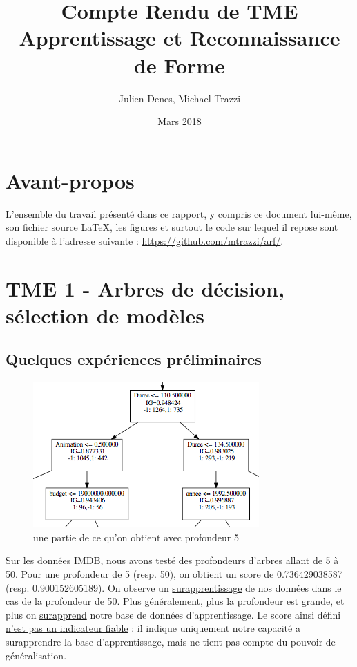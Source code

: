 \documentclass[a4paper]{article}
\title{Compte Rendu de TME \\ Apprentissage et Reconnaissance de Forme}
\author{Julien Denes, Michael Trazzi}
\date{Mars 2018}
\begin{document}
\maketitle

\section*{Avant-propos}

L'ensemble du travail présenté dans ce rapport, y compris ce document lui-même, son fichier source LaTeX, les figures et surtout le code sur lequel il repose sont disponible à l'adresse suivante : \href{https://github.com/mtrazzi/arf/}{https://github.com/mtrazzi/arf/}.



\section*{TME 1 - Arbres de décision, sélection de modèles}

\subsection*{Quelques expériences préliminaires}

\begin{figure}[ht!]
\begin{center}
\includegraphics[scale=0.5]{tree5_part}
\caption{une partie de ce qu'on obtient avec profondeur 5}
\label{profondeur}
\end{center}
\end{figure}

Sur les données IMDB, nous avons testé des profondeurs d'arbres allant de 5 à 50. Pour une profondeur de 5 (resp. 50), on obtient un score de 0.736429038587 (resp. 0.900152605189). On observe un \underline{surapprentissage} de nos données dans le cas de la profondeur de 50.  Plus généralement, plus la profondeur est grande, et plus on \underline{surapprend} notre base de données d'apprentissage. Le score ainsi défini \underline{n'est pas un indicateur fiable} : il indique uniquement notre capacité a surapprendre la base d'apprentissage, mais ne tient pas compte du pouvoir de généralisation.
\end{document}
